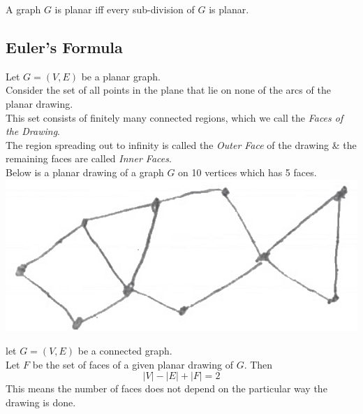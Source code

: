 \documentclass[11pt,a4paper]{article}
\begin{document}
A graph $G$ is planar iff every sub-division of $G$ is planar.\\

\subsection{Euler's Formula}

Let $G=(V,E)$ be a planar graph.\\
Consider the set of all points in the plane that lie on none of the arcs of the planar drawing.\\
This set consists of finitely many connected regions, which we call the \textit{Faces of the Drawing}.\\
The region spreading out to infinity is called the \textit{Outer Face} of the drawing \& the remaining faces are called \textit{Inner Faces}.\\

Below is a planar drawing of a graph $G$ on 10 vertices which has 5 faces.\\
\includegraphics[scale=0.3]{img/faces.png}

let $G=(V,E)$ be a connected graph.\\
Let $F$ be the set of faces of a given planar drawing of $G$. Then
$$|V|-|E|+|F|=2$$
\nb This means the number of faces does not depend on the particular way the drawing is done.\\
\end{document}
